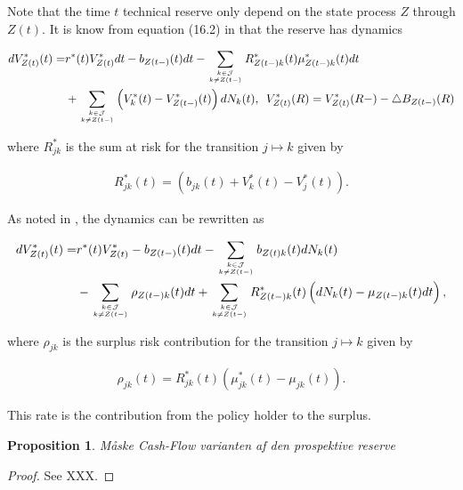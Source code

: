 \documentclass{book}
\newcommand{\1}[1]{\mathbbm{1}_{\left\lbrace #1 \right\rbrace}}
\theoremstyle{break}
\newtheorem{proposition}[definition]{Proposition}%
\theoremstyle{remark}
\numberwithin{equation}{section}
\begin{document}
Note that the time $t$ technical reserve only depend on the state process $Z$ through $Z(t)$. It is know from equation (16.2) in \cite{LivStok} that the reserve has dynamics

\begin{align*}
	dV_{Z(t)}^*(t) =& r^*(t) V_{Z(t)}^* dt - b_{Z(t-)}(t) dt - \sum_{k \in \mathcal{J} \atop k \neq Z(t-)} R_{Z(t-)k}^*(t) \mu_{Z(t-)k}^*(t) dt \\
	&+ \sum_{k \in \mathcal{J} \atop k \neq Z(t-)} \left( V_k^*(t) - V_{Z(t-)}^*(t) \right) dN_k(t), \, \, \, V_{Z(t)}^*(R) =  V_{Z(t)}^*(R-) - \triangle B_{Z(t-)}(R)
\end{align*}

where $R_{jk}^*$ is the sum at risk for the transition $j \mapsto k$ given by

\begin{align*}
	R_{jk}^*(t) = \left( b_{jk}(t) + V_{k}^*(t) - V_{j}^*(t) \right).
\end{align*}

As noted in \cite{Lollike}, the dynamics can be rewritten as

\begin{align} \label{ReserveDynamics}
\begin{split}
	dV_{Z(t)}^*(t) =& r^*(t) V_{Z(t)}^* - b_{Z(t-)}(t) dt - \sum_{k \in \mathcal{J} \atop k \neq Z(t-)} b_{Z(t)k}(t) dN_k(t) \\
	&- \sum_{k \in \mathcal{J} \atop k \neq Z(t-)} \rho_{Z(t-)k}(t) dt + \sum_{k \in \mathcal{J} \atop k \neq Z(t-)} R_{Z(t-)k}^*(t) \left( dN_k(t) - \mu_{Z(t-)k}(t) dt \right),
\end{split}
\end{align}

where $\rho_{jk}$ is the surplus risk contribution for the transition $j \mapsto k$ given by

\begin{align*}
	\rho_{jk}(t) = R_{jk}^*(t) \left( \mu_{jk}^*(t) - \mu_{jk}(t) \right).
\end{align*}

This rate is the contribution from the policy holder to the surplus.

\begin{proposition}
	Måske Cash-Flow varianten af den prospektive reserve
\end{proposition}

\begin{proof}
	See XXX.
\end{proof}
\end{document}
